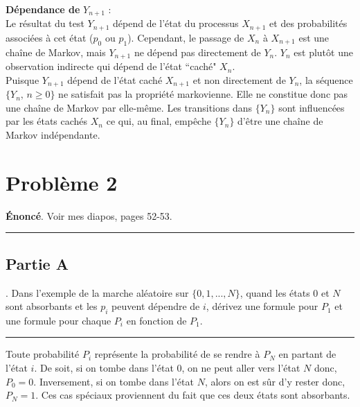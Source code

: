 \documentclass{article}
\begin{document}
\noindent \textbf{Dépendance de} $Y_{n+1}$ : \\
Le résultat du test $Y_{n+1}$ dépend de l'état du processus $X_{n+1}$ et des 
probabilités associées à cet état ($p_0$ ou $p_1$). Cependant, le passage de 
$X_n$ à $X_{n+1}$ est une chaîne de Markov, mais $Y_{n+1}$ ne dépend pas 
directement de $Y_n$. $Y_n$ est plutôt une observation indirecte qui dépend 
de l'état ``caché" $X_n$. \\

Puisque $Y_{n+1}$ dépend de l'état caché $X_{n+1}$ et non directement de $Y_n$, 
la séquence $\{Y_n,\, n \geq 0\}$ ne satisfait pas la propriété markovienne. Elle
ne constitue donc pas une chaîne de Markov par elle-même. Les transitions dans 
$\{Y_n\}$ sont influencées par les états cachés $X_n$ ce qui, au final, empêche 
$\{Y_n\}$ d'être une chaîne de Markov indépendante.



\newpage
\section*{Problème 2}
\textbf{Énoncé}. Voir mes diapos, pages 52-53.
\vspace{.6cm}
\hrule
\vspace{.2cm}
\subsection*{Partie A}
. Dans l'exemple de la marche aléatoire sur $\{0,1,...,N\}$, 
quand les états 0 et $N$ sont absorbants et les $p_i$ peuvent dépendre de
$i$, dérivez une formule pour $P_1$ et une formule pour chaque $P_i$ en
fonction de $P_1$.
\vspace{.2cm}
\hrule
\vspace{.4cm}
Toute probabilité $P_i$ représente la probabilité de se rendre à $P_N$
en partant de l'état $i$. De soit, si on tombe dans l'état 0, on ne peut
aller vers l'état $N$ donc, $P_0=0$. Inversement, si on tombe dans l'état
$N$, alors on est sûr d'y rester donc, $P_N=1$. Ces cas spéciaux proviennent
du fait que ces deux états sont absorbants.
\end{document}
